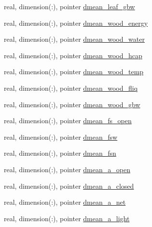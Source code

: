 \begin{DoxyCompactItemize}
\item 
real, dimension(\+:), pointer \hyperlink{structed__state__vars_1_1patchtype_a6366b97e5c81e9bf22d0ab63ef23ee32}{dmean\+\_\+leaf\+\_\+gbw}
\item 
real, dimension(\+:), pointer \hyperlink{structed__state__vars_1_1patchtype_a492bcffb9566d7d04b50626b6c1d1b96}{dmean\+\_\+wood\+\_\+energy}
\item 
real, dimension(\+:), pointer \hyperlink{structed__state__vars_1_1patchtype_a89f0bee3c32b8c9f69ee1e35ca19e4aa}{dmean\+\_\+wood\+\_\+water}
\item 
real, dimension(\+:), pointer \hyperlink{structed__state__vars_1_1patchtype_a643c1ad73dde2f0ba21f726a3ad37c27}{dmean\+\_\+wood\+\_\+hcap}
\item 
real, dimension(\+:), pointer \hyperlink{structed__state__vars_1_1patchtype_aad59c2664157ea749114af414e88fc02}{dmean\+\_\+wood\+\_\+temp}
\item 
real, dimension(\+:), pointer \hyperlink{structed__state__vars_1_1patchtype_adab80b46a34d19ca5fb60c07faab3722}{dmean\+\_\+wood\+\_\+fliq}
\item 
real, dimension(\+:), pointer \hyperlink{structed__state__vars_1_1patchtype_a3b6da13502dffe4ab13067a90272720a}{dmean\+\_\+wood\+\_\+gbw}
\item 
real, dimension(\+:), pointer \hyperlink{structed__state__vars_1_1patchtype_a1ce24cdff2306f72980290accca4bb1f}{dmean\+\_\+fs\+\_\+open}
\item 
real, dimension(\+:), pointer \hyperlink{structed__state__vars_1_1patchtype_abaf0faedb2cad50b3a2bfb896b2e1fd4}{dmean\+\_\+fsw}
\item 
real, dimension(\+:), pointer \hyperlink{structed__state__vars_1_1patchtype_aab7c922b75815be0ec9cad8ece1bd09d}{dmean\+\_\+fsn}
\item 
real, dimension(\+:), pointer \hyperlink{structed__state__vars_1_1patchtype_aa93da5f1dd545b437f099fb0084bba32}{dmean\+\_\+a\+\_\+open}
\item 
real, dimension(\+:), pointer \hyperlink{structed__state__vars_1_1patchtype_a666694e42ba96aec8d880332136f455e}{dmean\+\_\+a\+\_\+closed}
\item 
real, dimension(\+:), pointer \hyperlink{structed__state__vars_1_1patchtype_a13f94ec78c1bd75fed7354f6e3416cd2}{dmean\+\_\+a\+\_\+net}
\item 
real, dimension(\+:), pointer \hyperlink{structed__state__vars_1_1patchtype_a8de01f004495b30423c2b9d154d66c4f}{dmean\+\_\+a\+\_\+light}
\item 

\end{DoxyCompactItemize}
